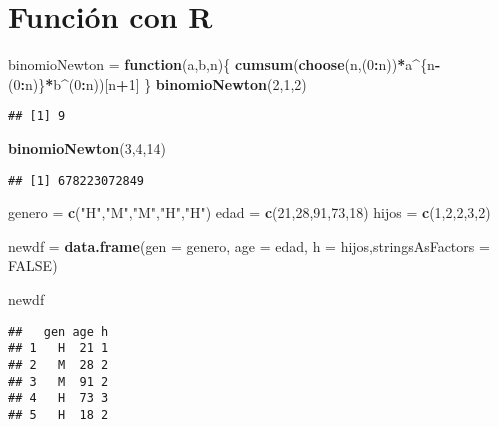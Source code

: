 \documentclass[
]{article}
\newenvironment{Shaded}{\begin{snugshade}}{\end{snugshade}}
\newcommand{\AttributeTok}[1]{\textcolor[rgb]{0.13,0.29,0.53}{#1}}
\newcommand{\ConstantTok}[1]{\textcolor[rgb]{0.56,0.35,0.01}{#1}}
\newcommand{\ControlFlowTok}[1]{\textcolor[rgb]{0.13,0.29,0.53}{\textbf{#1}}}
\newcommand{\DecValTok}[1]{\textcolor[rgb]{0.00,0.00,0.81}{#1}}
\newcommand{\FunctionTok}[1]{\textcolor[rgb]{0.13,0.29,0.53}{\textbf{#1}}}
\newcommand{\NormalTok}[1]{#1}
\newcommand{\OtherTok}[1]{\textcolor[rgb]{0.56,0.35,0.01}{#1}}
\newcommand{\SpecialCharTok}[1]{\textcolor[rgb]{0.81,0.36,0.00}{\textbf{#1}}}
\newcommand{\StringTok}[1]{\textcolor[rgb]{0.31,0.60,0.02}{#1}}
\begin{document}
\hypertarget{funciuxf3n-con-r-1}{%
\section{Función con R}\label{funciuxf3n-con-r-1}}

\begin{Shaded}
\begin{Highlighting}[]
\NormalTok{binomioNewton }\OtherTok{=} \ControlFlowTok{function}\NormalTok{(a,b,n)\{}
  \FunctionTok{cumsum}\NormalTok{(}\FunctionTok{choose}\NormalTok{(n,(}\DecValTok{0}\SpecialCharTok{:}\NormalTok{n))}\SpecialCharTok{*}\NormalTok{a}\SpecialCharTok{\^{}}\NormalTok{\{n}\SpecialCharTok{{-}}\NormalTok{(}\DecValTok{0}\SpecialCharTok{:}\NormalTok{n)\}}\SpecialCharTok{*}\NormalTok{b}\SpecialCharTok{\^{}}\NormalTok{(}\DecValTok{0}\SpecialCharTok{:}\NormalTok{n))[n}\SpecialCharTok{+}\DecValTok{1}\NormalTok{]}
\NormalTok{\}}
\FunctionTok{binomioNewton}\NormalTok{(}\DecValTok{2}\NormalTok{,}\DecValTok{1}\NormalTok{,}\DecValTok{2}\NormalTok{)}
\end{Highlighting}
\end{Shaded}

\begin{verbatim}
## [1] 9
\end{verbatim}

\begin{Shaded}
\begin{Highlighting}[]
\FunctionTok{binomioNewton}\NormalTok{(}\DecValTok{3}\NormalTok{,}\DecValTok{4}\NormalTok{,}\DecValTok{14}\NormalTok{)}
\end{Highlighting}
\end{Shaded}

\begin{verbatim}
## [1] 678223072849
\end{verbatim}

\begin{Shaded}
\begin{Highlighting}[]
\NormalTok{genero }\OtherTok{=} \FunctionTok{c}\NormalTok{(}\StringTok{"H"}\NormalTok{,}\StringTok{"M"}\NormalTok{,}\StringTok{"M"}\NormalTok{,}\StringTok{"H"}\NormalTok{,}\StringTok{"H"}\NormalTok{)}
\NormalTok{edad }\OtherTok{=} \FunctionTok{c}\NormalTok{(}\DecValTok{21}\NormalTok{,}\DecValTok{28}\NormalTok{,}\DecValTok{91}\NormalTok{,}\DecValTok{73}\NormalTok{,}\DecValTok{18}\NormalTok{)}
\NormalTok{hijos }\OtherTok{=} \FunctionTok{c}\NormalTok{(}\DecValTok{1}\NormalTok{,}\DecValTok{2}\NormalTok{,}\DecValTok{2}\NormalTok{,}\DecValTok{3}\NormalTok{,}\DecValTok{2}\NormalTok{)}

\NormalTok{newdf }\OtherTok{=} \FunctionTok{data.frame}\NormalTok{(}\AttributeTok{gen =}\NormalTok{ genero, }\AttributeTok{age =}\NormalTok{ edad, }\AttributeTok{h =}\NormalTok{ hijos,}\AttributeTok{stringsAsFactors =} \ConstantTok{FALSE}\NormalTok{)}

\NormalTok{newdf}
\end{Highlighting}
\end{Shaded}

\begin{verbatim}
##   gen age h
## 1   H  21 1
## 2   M  28 2
## 3   M  91 2
## 4   H  73 3
## 5   H  18 2
\end{verbatim}
\end{document}
